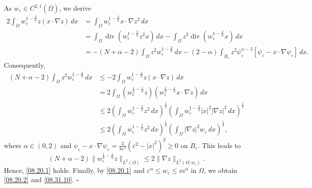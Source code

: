 \documentclass[11pt]{article}
\newenvironment{proof}{{\bf {Proof.}}}{\hfill $\square$}
\numberwithin{equation}{section}
\def\e{\varepsilon}
\def\bf{\textbf}
\DeclareMathOperator{\Div}{div}
\begin{document}
 \begin{proof}
As $w_\e \in C^{2,1}(\overline{\Omega})$, we derive
\begin{equation*}
\begin{split}
2\int_{\Omega} w_\e^{1 - \frac{2}{\alpha}}z(x \cdot \nabla z) \, dx
&= \int_{\Omega} w_\e^{1 - \frac{2}{\alpha}}x \cdot \nabla z^2 \, dx \\
&= \int_{\Omega} \Div\left(w_\e^{1 - \frac{2}{\alpha}}z^2x\right) \, dx - \int_{\Omega} z^2\Div\left(w_\e^{1 - \frac{2}{\alpha}}x\right) \, dx \\
&= -(N + \alpha - 2)\int_{\Omega} z^2w_\e^{1 - \frac{2}{\alpha}} \, dx - (2 - \alpha)\int_{B_\e}z^2\psi_\e^{\alpha - 3}[\psi_\e - x \cdot \nabla\psi_\e] \, dx.
\end{split}
\end{equation*}
Consequently,
\begin{equation*}
\begin{split}
(N + \alpha - 2)\int_{\Omega} z^2w_\e^{1 - \frac{2}{\alpha}} \, dx
&\leq -2\int_{\Omega} w_\e^{1 - \frac{2}{\alpha}}z(x \cdot \nabla z) \, dx \\
&= 2\int_{\Omega} \left(w_\e^{\frac{1}{2} - \frac{1}{\alpha}}z\right)\left(w_\e^{\frac{1}{2} - \frac{1}{\alpha}}x \cdot \nabla z\right) \, dx \\
&\leq 2\left(\int_{\Omega} w_\e^{1 - \frac{2}{\alpha}}z^2 \, dx\right)^{\frac{1}{2}}\left(\int_{\Omega} w_\e^{1 - \frac{2}{\alpha}}|x|^2|\nabla z|^2 \, dx\right)^{\frac{1}{2}} \\
&\leq 2\left(\int_{\Omega} w_\e^{1 - \frac{2}{\alpha}}z^2 \, dx\right)^{\frac{1}{2}}\left(\int_{\Omega} |\nabla z|^2w_\e \, dx\right)^{\frac{1}{2}},
\end{split}
\end{equation*}
where $\alpha \in (0,2)$ and $\psi_\e - x \cdot \nabla\psi_\e = \frac{3}{8\e^3}(\e^2 - |x|^2)^2 \geq 0$ on $B_\e$. This leads to
\begin{equation*}
(N + \alpha - 2)\|w_\e^{\frac{1}{2} - \frac{1}{\alpha}}z\|_{L^2(\Omega)} \leq 2\|\nabla z\|_{L^2(\Omega; w_\e)}.
\end{equation*}
Hence, \eqref{08.20.1} holds.
Finally, by \eqref{08.20.1} and $\e^\alpha \leq w_\e \leq m^\alpha$ in $\Omega$, we obtain \eqref{08.20.2} and \eqref{08.31.10}.
\end{proof}
\end{document}
